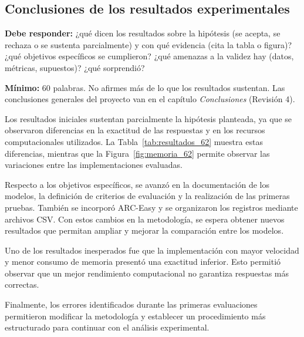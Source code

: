 \subsection{Conclusiones de los resultados experimentales} \label{sec:conclusiones_resultados} %

\begin{guia}
\textbf{Debe responder:} ¿qué dicen los resultados sobre la hipótesis (se acepta, se rechaza o se sustenta parcialmente) y
con qué evidencia (cita la tabla o figura)? ¿qué objetivos específicos se cumplieron? ¿qué amenazas a la validez hay
(datos, métricas, supuestos)? ¿qué sorprendió?

\textbf{Mínimo:} 60 palabras. No afirmes más de lo que los resultados sustentan. Las conclusiones generales del proyecto
van en el capítulo \emph{Conclusiones} (Revisión 4).
\end{guia}


Los resultados iniciales sustentan parcialmente la hipótesis planteada, ya que se observaron diferencias en la exactitud de las respuestas y en los recursos computacionales utilizados. La Tabla~\ref{tab:resultados_62} muestra estas diferencias, mientras que la Figura~\ref{fig:memoria_62} permite observar las variaciones entre las implementaciones evaluadas.

Respecto a los objetivos específicos, se avanzó en la documentación de los modelos, la definición de criterios de evaluación y la realización de las primeras pruebas. También se incorporó ARC-Easy y se organizaron los registros mediante archivos CSV. Con estos cambios en la metodología, se espera obtener nuevos resultados que permitan ampliar y mejorar la comparación entre los modelos.

Uno de los resultados inesperados fue que la implementación con mayor velocidad y menor consumo de memoria presentó una exactitud inferior. Esto permitió observar que un mejor rendimiento computacional no garantiza respuestas más correctas.

Finalmente, los errores identificados durante las primeras evaluaciones permitieron modificar la metodología y establecer un procedimiento más estructurado para continuar con el análisis experimental.
